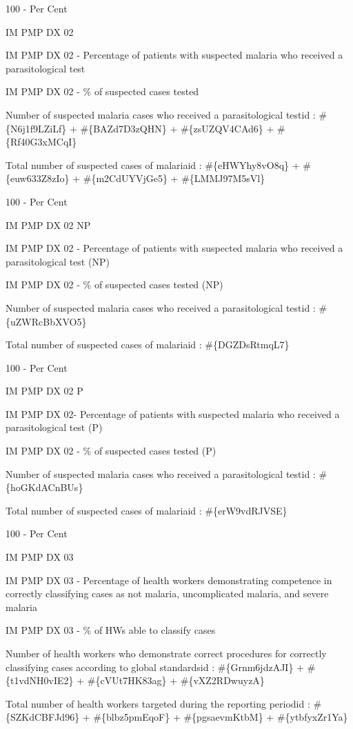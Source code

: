 \documentclass[]{book}
\begin{document}
100 - Per Cent

IM PMP DX 02

IM PMP DX 02 - Percentage of patients with suspected malaria who received a parasitological test

IM PMP DX 02 - \% of suspected cases tested

Number of suspected malaria cases who received a parasitological testid : \#\{N6j1f9LZiLf\} + \#\{BAZd7D3zQHN\} + \#\{zsUZQV4CAd6\} + \#\{Rf40G3xMCqI\}

Total number of suspected cases of malariaid : \#\{eHWYhy8vO8q\} + \#\{euw633Z8zIo\} + \#\{m2CdUYVjGe5\} + \#\{LMMJ97M5sVl\}

100 - Per Cent

IM PMP DX 02 NP

IM PMP DX 02 - Percentage of patients with suspected malaria who received a parasitological test (NP)

IM PMP DX 02 - \% of suspected cases tested (NP)

Number of suspected malaria cases who received a parasitological testid : \#\{uZWRcBbXVO5\}

Total number of suspected cases of malariaid : \#\{DGZDsRtmqL7\}

100 - Per Cent

IM PMP DX 02 P

IM PMP DX 02- Percentage of patients with suspected malaria who received a parasitological test (P)

IM PMP DX 02 - \% of suspected cases tested (P)

Number of suspected malaria cases who received a parasitological testid : \#\{hoGKdACnBUs\}

Total number of suspected cases of malariaid : \#\{erW9vdRJVSE\}

100 - Per Cent

IM PMP DX 03

IM PMP DX 03 - Percentage of health workers demonstrating competence in correctly classifying cases as not malaria, uncomplicated malaria, and severe malaria

IM PMP DX 03 - \% of HWs able to classify cases

Number of health workers who demonstrate correct procedures for correctly classifying cases according to global standardsid : \#\{Grnm6jdzAJI\} + \#\{t1vdNH0vIE2\} + \#\{cVUt7HK83ag\} + \#\{vXZ2RDwuyzA\}

Total number of health workers targeted during the reporting periodid : \#\{SZKdCBFJd96\} + \#\{blbz5pmEqoF\} + \#\{pgsaevmKtbM\} + \#\{ytbfyxZr1Ya\}
\end{document}
